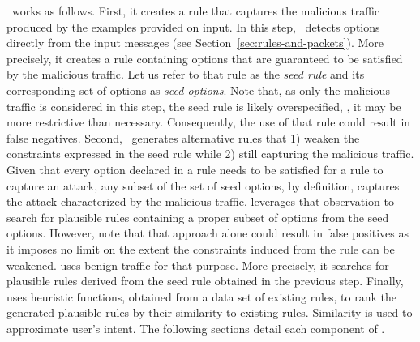 \documentclass[sigconf,review, anonymous]{acmart}
\begin{document}
\tname\ works as follows. First, it creates a rule that captures the
malicious traffic produced by the examples provided on input. In this
step, \tname\ detects options directly from the input messages (see
Section~\ref{sec:rules-and-packets}). More precisely, it creates a
rule containing options that are guaranteed to be satisfied by the
malicious traffic. Let us refer to that rule as the \emph{seed rule}
and its corresponding set of options as \emph{seed options}. Note
that, as only the malicious traffic is considered in this step, the
seed rule is likely overspecified, \ie{}, it may be more restrictive
than necessary. Consequently, the use of that rule could result in
false negatives. Second, \tname\ generates alternative rules that 1)
weaken the constraints expressed in the seed rule while 2) still
capturing the malicious traffic. Given that every option declared in a
rule needs to be satisfied for a rule to capture an attack, any subset
of the set of seed options, by definition, captures the attack
characterized by the malicious traffic. \tname{} leverages that
observation to search for plausible rules containing a proper subset
of options from the seed options. However, note that that approach
alone could result in false positives as it imposes no limit on the
extent the constraints induced from the rule can be weakened. \tname{}
uses benign traffic for that purpose. More precisely, it searches for
plausible rules derived from the seed rule obtained in the previous
step. Finally, \tname{} uses heuristic functions, obtained from a data
set of existing rules, to rank the generated plausible rules by their
similarity to existing rules. Similarity is used to approximate user's
intent. The following sections detail each component of \tname.




\end{document}
